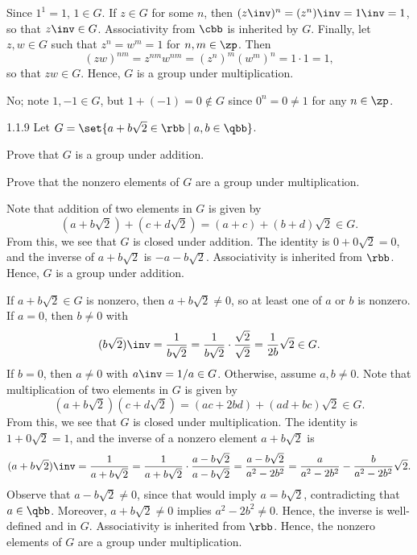 \begin{solenum}
    \item Since $1^1 = 1$, $1 \in G$.
	If $z \in G$ for some $n$, then $(z\inv)^n = (z^n)\inv = 1\inv = 1$, so that $z\inv \in G$.
	Associativity from $\cbb$ is inherited by $G$.
	Finally, let $z, w \in G$ such that $z^n = w^m = 1$ for $n, m \in \zp$.
	Then
    \[
    	(zw)^{nm} = z^{nm} w^{nm} = (z^n)^m (w^m)^n = 1 \cdot 1 = 1,
    \]
    so that $zw \in G$.
	Hence, $G$ is a group under multiplication.
    \item No; note $1, -1 \in G$, but $1 + (-1) = 0 \notin G$ since $0^n = 0 \neq 1$ for any $n \in \zp$.
\end{solenum}

\begin{exercise}{1.1.9}
    Let $G = \set{ a + b\sqrt{2} \in \rbb \mid a, b \in \qbb }$.
    \begin{subexercises}
        \item Prove that $G$ is a group under addition.
        \item Prove that the nonzero elements of $G$ are a group under multiplication.
        
    \end{subexercises}
\end{exercise}

\begin{solenum}
    \item Note that addition of two elements in $G$ is given by
    \[
    	(a + b\sqrt 2) + (c + d\sqrt 2) = (a + c) + (b + d)\sqrt 2 \in G.
    \]
    From this, we see that $G$ is closed under addition.
	The identity is $0 + 0\sqrt 2 = 0$, and the inverse of $a + b\sqrt 2$ is $-a - b\sqrt 2$.
	Associativity is inherited from $\rbb$.
	Hence, $G$ is a group under addition.
    \item If $a + b\sqrt 2 \in G$ is nonzero, then $a + b\sqrt 2 \neq 0$, so at least one of $a$ or $b$ is nonzero.
    If $a = 0$, then $b \neq 0$ with
    \[
        (b\sqrt 2)\inv = \frac{1}{b\sqrt 2} = \frac{1}{b\sqrt 2} \cdot \frac{\sqrt 2}{\sqrt 2} = \frac{1}{2b}\sqrt 2 \in G.
    \]
    If $b = 0$, then $a \neq 0$ with $a\inv = 1/a \in G$.
    Otherwise, assume $a, b \neq 0$.
    Note that multiplication of two elements in $G$ is given by
    \[
    	(a + b\sqrt 2)(c + d\sqrt 2) = (ac + 2bd) + (ad + bc)\sqrt 2 \in G.
    \]
    From this, we see that $G$ is closed under multiplication.
	The identity is $1 + 0\sqrt 2 = 1$, and the inverse of a nonzero element $a + b\sqrt 2$ is
    \[
    	(a + b\sqrt 2)\inv = \frac{1}{a + b\sqrt 2} = \frac{1}{a + b\sqrt 2} \cdot \frac{a - b\sqrt 2}{a - b\sqrt 2} = \frac{a - b\sqrt 2}{a^2 - 2b^2} = \frac a{a^2 - 2b^2} - \frac b{a^2 - 2b^2}\sqrt 2.
    \]
    Observe that $a - b\sqrt 2 \neq 0$, since that would imply $a = b\sqrt 2$, contradicting that $a \in \qbb$.
	Moreover, $a + b\sqrt 2 \neq 0$ implies $a^2 - 2b^2 \neq 0$.
	Hence, the inverse is well-defined and in $G$.
	Associativity is inherited from $\rbb$.
	Hence, the nonzero elements of $G$ are a group under multiplication.
\end{solenum}

